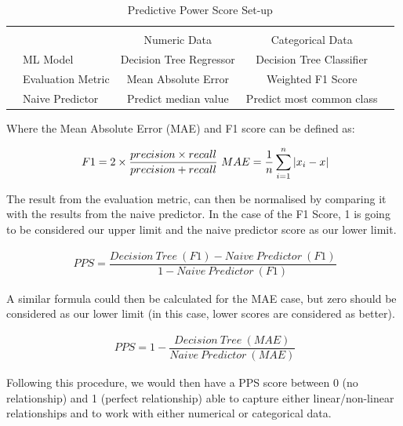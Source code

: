 {
\begin{table}[h!]
\centering
\begin{tabular}{l|l|c|c|c}
\multicolumn{2}{c}{}&\multicolumn{2}{c}{}&\\
\cline{3-4}
\multicolumn{2}{c|}{}&Numeric Data &Categorical Data &\multicolumn{1}{c}{}\\
\cline{2-4}
\multirow{}{}{}& ML Model & Decision Tree Regressor & Decision Tree Classifier & \\
\cline{2-4}
& Evaluation Metric & Mean Absolute Error & Weighted F1 Score & \\
\cline{2-4}
& Naive Predictor & Predict median value & Predict most common class & \\
\cline{2-4}
\end{tabular}
\caption{Predictive Power Score Set-up}
\label{setup}
\end{table}
}

Where the Mean Absolute Error (MAE) and F1 score can be defined as:

\useshortskip
\begin{align}
\ F1 = 2 \times \dfrac{precision \times recall}{precision + recall}
\ MAE = \dfrac{1}{n}\sum_{i=1}^{n}\abs{x_{i} - x}
\end{align}
\useshortskip

The result from the evaluation metric, can then be normalised by comparing it with the results from the naive predictor. In the case of the F1 Score, 1 is going to be considered our upper limit and the naive predictor score as our lower limit.

\useshortskip
\begin{align}
\ PPS = \dfrac{Decision\:Tree\:(F1) - Naive\:Predictor\:(F1)}{1 - Naive\:Predictor\:(F1)}
\end{align}
\useshortskip

A similar formula could then be calculated for the MAE case, but zero should be considered as our lower limit (in this case, lower scores are considered as better).

\useshortskip
\begin{align}
\ PPS = 1 - \dfrac{Decision\:Tree\:(MAE)}{Naive\:Predictor\:(MAE)}
\end{align}
\useshortskip

Following this procedure, we would then have a PPS score between 0 (no relationship) and 1 (perfect relationship) able to capture either linear/non-linear relationships and to work with either numerical or categorical data. 

